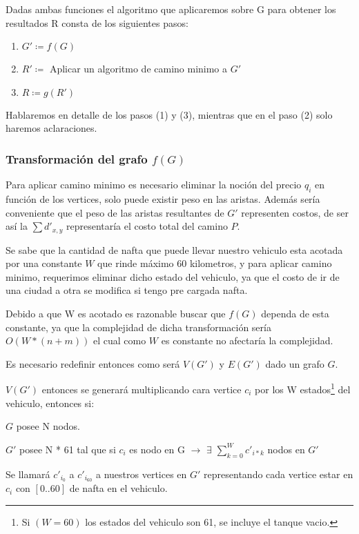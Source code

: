\documentclass[12pt]{article}
\def\is{\coloneqq}
\begin{document}
Dadas ambas funciones el algoritmo que aplicaremos sobre G para obtener los resultados R consta de los siguientes pasos:

\begin{enumerate}
	\item $G' \is f(G)$
	\item $R' \is$ Aplicar un algoritmo de camino minimo a $G'$
	\item $R \is g(R')$
\end{enumerate}

Hablaremos en detalle de los pasos (1) y (3), mientras que en el paso (2) solo haremos aclaraciones.

\subsubsection{Transformación del grafo $f(G)$}

Para aplicar camino minimo es necesario eliminar la noción del precio $q_i$ en función de los vertices, solo puede existir peso en las aristas. Además sería conveniente que el peso de las aristas resultantes de $G'$ representen costos, de ser así la $\sum d'_{x,y}$ representaría el costo total del camino $P$.  

Se sabe que la cantidad de nafta que puede llevar nuestro vehiculo esta acotada por una constante $W$ que rinde máximo 60 kilometros, y para aplicar camino minimo, requerimos eliminar dicho estado del vehiculo, ya que el costo de ir de una ciudad a otra se modifica si tengo pre cargada nafta. 

Debido a que W es acotado es razonable buscar que $f(G)$ dependa de esta constante, ya que la complejidad de dicha transformación sería $O(W * (n + m))$ el cual como $W$ es constante no afectaría la complejidad.

Es necesario redefinir entonces como será $V(G')$ y $E(G')$ dado un grafo $G$. 

$V(G')$ entonces se generará multiplicando cara vertice $c_i$ por los W estados\footnote{Si $(W = 60)$ los estados del vehiculo son 61, se incluye el tanque vacio.} del vehiculo, entonces si:

$G$ posee  N nodos. 

$G'$ posee N * 61 tal que si $c_i$ es nodo en G $\rightarrow$ $\exists$ $\sum_{k=0}^{W} c'_{i * k}$ nodos en $G'$

Se llamará $c'_{i_0}$ a $c'_{i_{60}}$ a nuestros vertices en $G'$ representando cada vertice estar en $c_i$ con $[0..60]$ de nafta en el vehiculo. 
\end{document}
